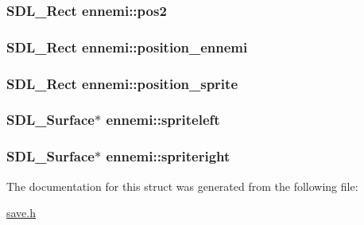 \subsubsection[{\texorpdfstring{pos2}{pos2}}]{\setlength{\rightskip}{0pt plus 5cm}S\+D\+L\+\_\+\+Rect ennemi\+::pos2}\hypertarget{structennemi_a1fca83eeee08fde8a80a8b9c0a0ae00f}{}\label{structennemi_a1fca83eeee08fde8a80a8b9c0a0ae00f}
\subsubsection[{\texorpdfstring{position\+\_\+ennemi}{position_ennemi}}]{\setlength{\rightskip}{0pt plus 5cm}S\+D\+L\+\_\+\+Rect ennemi\+::position\+\_\+ennemi}\hypertarget{structennemi_ab236808a3af75588847442504250d02f}{}\label{structennemi_ab236808a3af75588847442504250d02f}
\subsubsection[{\texorpdfstring{position\+\_\+sprite}{position_sprite}}]{\setlength{\rightskip}{0pt plus 5cm}S\+D\+L\+\_\+\+Rect ennemi\+::position\+\_\+sprite}\hypertarget{structennemi_abc473e1ffbf2e5848151d900724e3f83}{}\label{structennemi_abc473e1ffbf2e5848151d900724e3f83}
\subsubsection[{\texorpdfstring{spriteleft}{spriteleft}}]{\setlength{\rightskip}{0pt plus 5cm}S\+D\+L\+\_\+\+Surface$\ast$ ennemi\+::spriteleft}\hypertarget{structennemi_a4f333ffffb5036c74a62a60437d60422}{}\label{structennemi_a4f333ffffb5036c74a62a60437d60422}
\subsubsection[{\texorpdfstring{spriteright}{spriteright}}]{\setlength{\rightskip}{0pt plus 5cm}S\+D\+L\+\_\+\+Surface$\ast$ ennemi\+::spriteright}\hypertarget{structennemi_a8ad9de831604958b2654c033280129f1}{}\label{structennemi_a8ad9de831604958b2654c033280129f1}


The documentation for this struct was generated from the following file\+:\begin{DoxyCompactItemize}
\item 
\hyperlink{save_8h}{save.\+h}\end{DoxyCompactItemize}
